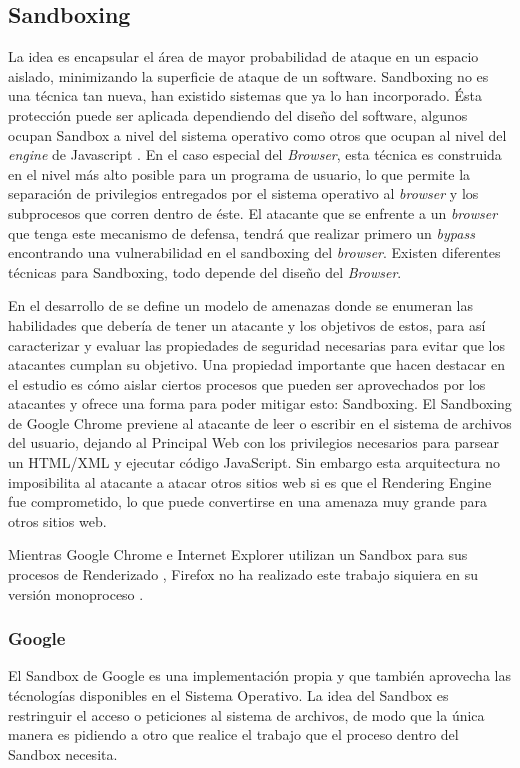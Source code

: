 \subsection{Sandboxing}
    \label{chap3:Sandboxing}
    La idea es encapsular el área de mayor probabilidad de ataque en un espacio aislado, minimizando la superficie de ataque de un software. Sandboxing no es una técnica tan nueva, han existido sistemas que ya lo han incorporado. Ésta protección puede ser aplicada dependiendo del diseño del software, algunos ocupan Sandbox a nivel del sistema operativo como otros que ocupan al nivel del \textit{engine} de Javascript \cite{reis2009browser}. En el caso especial del \textit{Browser}, esta técnica es construida en el nivel más alto posible para un programa de usuario, lo que permite la separación de privilegios entregados por el sistema operativo al \textit{browser} y los subprocesos que corren dentro de éste. El atacante que se enfrente a un \textit{browser} que tenga este mecanismo de defensa, tendrá que realizar primero un \textit{bypass} encontrando una vulnerabilidad en el sandboxing del \textit{browser}. Existen diferentes técnicas para Sandboxing, todo depende del diseño del \textit{Browser}.

    En el desarrollo de \cite{barth2008security} se define un modelo de amenazas donde se enumeran las habilidades que debería de tener un atacante y los objetivos de estos, para así caracterizar y evaluar las propiedades de seguridad necesarias para evitar que los atacantes cumplan su objetivo. Una propiedad importante que hacen destacar en el estudio es cómo aislar ciertos procesos que pueden ser aprovechados por los atacantes y ofrece una forma para poder mitigar esto: Sandboxing. El Sandboxing de Google Chrome previene al atacante de leer o escribir en el sistema de archivos del usuario, dejando al Principal Web con los privilegios necesarios para parsear un HTML/XML y ejecutar código JavaScript. Sin embargo esta arquitectura no imposibilita al atacante a atacar otros sitios web si es que el Rendering Engine fue comprometido, lo que puede convertirse en una amenaza muy grande para otros sitios web.

    Mientras Google Chrome e Internet Explorer utilizan un Sandbox para sus procesos de Renderizado \cite{sandboxGC}, Firefox no ha realizado este trabajo siquiera en su versión monoproceso \cite{NeckoElectro}.



    \subsubsection{Google}
        El Sandbox de Google es una implementación propia y que también aprovecha las técnologías disponibles en el Sistema Operativo. La idea del Sandbox es restringuir el acceso o peticiones al sistema de archivos, de modo que la única manera es pidiendo a otro que realice el trabajo que el proceso dentro del Sandbox necesita.

